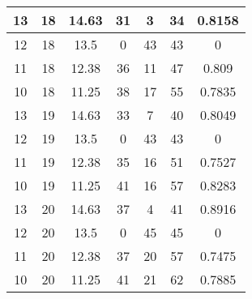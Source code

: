\documentclass[letterpaper, 12pt]{article}
\begin{document}
\begin{longtable}{|c|c|c|c|c|c|c|}
\hline
13 & 18 & 14.63 & 31 & 3 & 34 & 0.8158 \\
\hline
12 & 18 & 13.5 & 0 & 43 & 43 & 0 \\
\hline
11 & 18 & 12.38 & 36 & 11 & 47 & 0.809 \\
\hline
10 & 18 & 11.25 & 38 & 17 & 55 & 0.7835 \\
\hline
13 & 19 & 14.63 & 33 & 7 & 40 & 0.8049 \\
\hline
12 & 19 & 13.5 & 0 & 43 & 43 & 0 \\
\hline
11 & 19 & 12.38 & 35 & 16 & 51 & 0.7527 \\
\hline
10 & 19 & 11.25 & 41 & 16 & 57 & 0.8283 \\
\hline
13 & 20 & 14.63 & 37 & 4 & 41 & 0.8916 \\
\hline
12 & 20 & 13.5 & 0 & 45 & 45 & 0 \\
\hline
11 & 20 & 12.38 & 37 & 20 & 57 & 0.7475 \\
\hline
10 & 20 & 11.25 & 41 & 21 & 62 & 0.7885 \\
\hline
\end{longtable}
\end{document}
